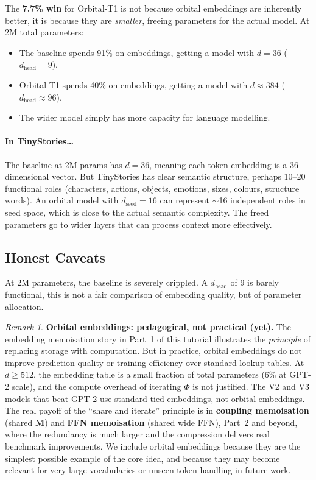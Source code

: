 \documentclass[11pt, a4paper]{article}
\newcommand{\M}{\mathbf{M}}
\theoremstyle{remark}
\newtheorem*{remark}{Remark}
\begin{document}
The \textbf{7.7\% win} for Orbital-T1 is not because orbital embeddings are inherently better, it is because they are \emph{smaller}, freeing parameters for the actual model.
At 2M total parameters:
\begin{itemize}[nosep]
    \item The baseline spends 91\% on embeddings, getting a model with $d = 36$ ($d_{\text{head}} = 9$).
    \item Orbital-T1 spends 40\% on embeddings, getting a model with $d \approx 384$ ($d_{\text{head}} \approx 96$).
    \item The wider model simply has more capacity for language modelling.
\end{itemize}

\paragraph{In TinyStories\ldots}
The baseline at 2M params has $d = 36$, meaning each token embedding is a 36-dimensional vector.
But TinyStories has clear semantic structure, perhaps 10--20 functional roles (characters, actions, objects, emotions, sizes, colours, structure words).
An orbital model with $d_{\text{seed}} = 16$ can represent $\sim$16 independent roles in seed space, which is close to the actual semantic complexity.
The freed parameters go to wider layers that can process context more effectively.

\subsection{Honest Caveats}

At 2M parameters, the baseline is severely crippled.
A $d_{\text{head}}$ of 9 is barely functional, this is not a fair comparison of embedding quality, but of parameter allocation.

\begin{remark}
\textbf{Orbital embeddings: pedagogical, not practical (yet).}
The embedding memoisation story in Part~1 of this tutorial illustrates the \emph{principle} of replacing storage with computation.
But in practice, orbital embeddings do not improve prediction quality or training efficiency over standard lookup tables.
At $d \geq 512$, the embedding table is a small fraction of total parameters (6\% at GPT-2 scale), and the compute overhead of iterating $\Phi$ is not justified.
The V2 and V3 models that beat GPT-2 use standard tied embeddings, not orbital embeddings.
The real payoff of the ``share and iterate'' principle is in \textbf{coupling memoisation} (shared $\M$) and \textbf{FFN memoisation} (shared wide FFN), Part~2 and beyond, where the redundancy is much larger and the compression delivers real benchmark improvements.
We include orbital embeddings because they are the simplest possible example of the core idea, and because they may become relevant for very large vocabularies or unseen-token handling in future work.
\end{remark}
\end{document}
